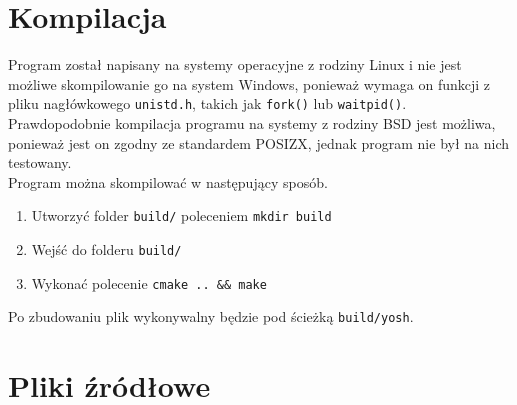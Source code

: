 \documentclass{article}
\begin{document}
\section{Kompilacja}

Program został napisany na systemy operacyjne z rodziny Linux i nie jest możliwe skompilowanie go na system Windows,
ponieważ wymaga on funkcji z pliku nagłówkowego \texttt{unistd.h}, takich jak \texttt{fork()} lub \texttt{waitpid()}. 
Prawdopodobnie kompilacja programu na systemy z rodziny BSD jest możliwa, ponieważ jest on zgodny ze standardem POSIZX, 
jednak program nie był na nich testowany.\\
Program można skompilować w następujący sposób.
    \begin{enumerate}
            \item Utworzyć folder \texttt{build/} poleceniem \texttt{mkdir build}
            \item Wejść do folderu  \texttt{build/}
            \item Wykonać polecenie \texttt{cmake .. \&\& make}
    \end{enumerate}

Po zbudowaniu plik wykonywalny będzie pod ścieżką \texttt{build/yosh}.

\section{Pliki źródłowe}
\end{document}
